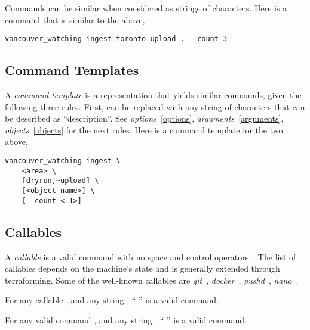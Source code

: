 Commands can be similar when considered as strings of characters. Here is a command that is similar to the above,
%
\begin{verbatim}
vancouver_watching ingest toronto upload . --count 3
\end{verbatim}

\subsection{Command Templates}
\label{command-template}

A \emph{command template} is a representation that yields similar commands, given the following three rules. First,  can be replaced with any string of characters that can be described as ``description''. See \emph{options}~\ref{options}, \emph{arguments}~\ref{arguments}, \emph{objects}~\ref{objects} for the next rules. Here is a command template for the two above,
%
\begin{verbatim}
vancouver_watching ingest \
    <area> \
    [dryrun,~upload] \
    [<object-name>] \
    [--count <-1>]
\end{verbatim}

\subsection{Callables}
\label{callables}

A \emph{callable} is a valid command with no space and control operators~. The list of callables depends on the machine's state and is generally extended through terraforming. Some of the well-known callables are \emph{git}~, \emph{docker}~, \emph{pushd}~, \emph{nano}~. 

\begin{theorem}
For any callable , and any string , `` '' is a valid command.
\end{theorem}

\begin{theorem}
For any valid command \placeholder{command}, and any string \placeholder{suffix}, ``\placeholder{command} \placeholder{suffix}'' is a valid command.
\end{theorem}